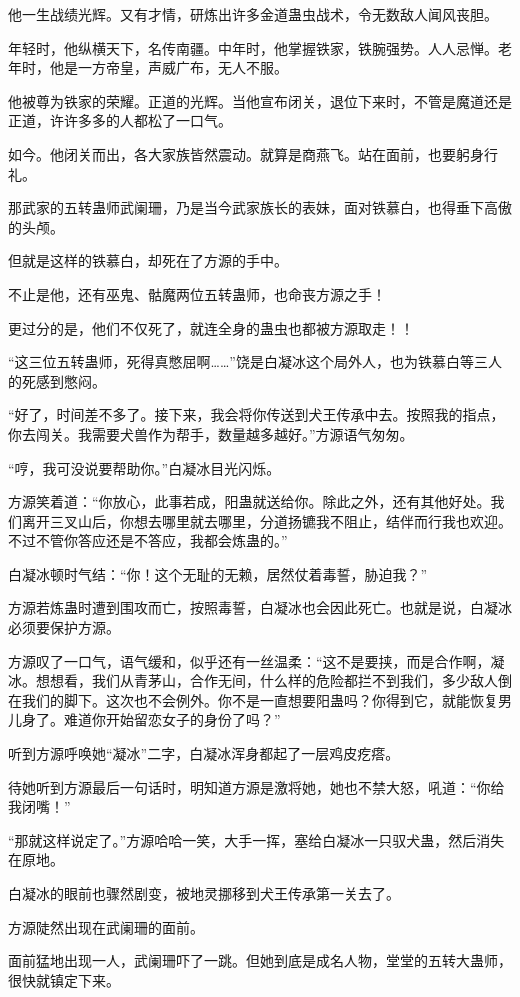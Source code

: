 \begin{this_body}
他一生战绩光辉。又有才情，研炼出许多金道蛊虫战术，令无数敌人闻风丧胆。

年轻时，他纵横天下，名传南疆。中年时，他掌握铁家，铁腕强势。人人忌惮。老年时，他是一方帝皇，声威广布，无人不服。

他被尊为铁家的荣耀。正道的光辉。当他宣布闭关，退位下来时，不管是魔道还是正道，许许多多的人都松了一口气。

如今。他闭关而出，各大家族皆然震动。就算是商燕飞。站在面前，也要躬身行礼。

那武家的五转蛊师武阑珊，乃是当今武家族长的表妹，面对铁慕白，也得垂下高傲的头颅。

但就是这样的铁慕白，却死在了方源的手中。

不止是他，还有巫鬼、骷魔两位五转蛊师，也命丧方源之手！

更过分的是，他们不仅死了，就连全身的蛊虫也都被方源取走！！

“这三位五转蛊师，死得真憋屈啊……”饶是白凝冰这个局外人，也为铁慕白等三人的死感到憋闷。

“好了，时间差不多了。接下来，我会将你传送到犬王传承中去。按照我的指点，你去闯关。我需要犬兽作为帮手，数量越多越好。”方源语气匆匆。

“哼，我可没说要帮助你。”白凝冰目光闪烁。

方源笑着道：“你放心，此事若成，阳蛊就送给你。除此之外，还有其他好处。我们离开三叉山后，你想去哪里就去哪里，分道扬镳我不阻止，结伴而行我也欢迎。不过不管你答应还是不答应，我都会炼蛊的。”

白凝冰顿时气结：“你！这个无耻的无赖，居然仗着毒誓，胁迫我？”

方源若炼蛊时遭到围攻而亡，按照毒誓，白凝冰也会因此死亡。也就是说，白凝冰必须要保护方源。

方源叹了一口气，语气缓和，似乎还有一丝温柔：“这不是要挟，而是合作啊，凝冰。想想看，我们从青茅山，合作无间，什么样的危险都拦不到我们，多少敌人倒在我们的脚下。这次也不会例外。你不是一直想要阳蛊吗？你得到它，就能恢复男儿身了。难道你开始留恋女子的身份了吗？”

听到方源呼唤她“凝冰”二字，白凝冰浑身都起了一层鸡皮疙瘩。

待她听到方源最后一句话时，明知道方源是激将她，她也不禁大怒，吼道：“你给我闭嘴！”

“那就这样说定了。”方源哈哈一笑，大手一挥，塞给白凝冰一只驭犬蛊，然后消失在原地。

白凝冰的眼前也骤然剧变，被地灵挪移到犬王传承第一关去了。

方源陡然出现在武阑珊的面前。

面前猛地出现一人，武阑珊吓了一跳。但她到底是成名人物，堂堂的五转大蛊师，很快就镇定下来。


\end{this_body}
